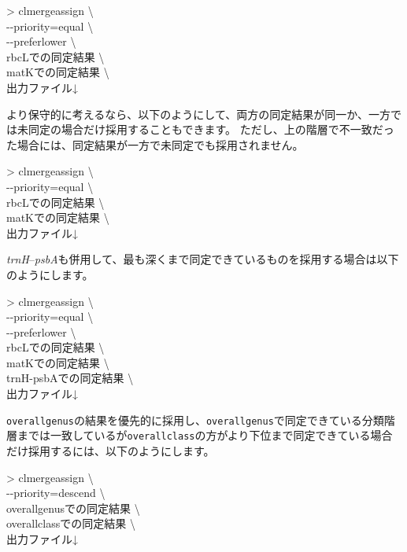 \documentclass[titlepage,10pt,a4paper]{jsbook}
\newenvironment{cmd}{\begin{oframed}\raggedright\ttfamily\footnotesize\setlength{\baselineskip}{1.4em}}{\end{oframed}\vspace{-1em}}
\begin{document}
\begin{cmd}
{\textgreater} clmergeassign {\textbackslash}\\
{-}{-}priority=equal {\textbackslash}\\
{-}{-}preferlower {\textbackslash}\\
rbcLでの同定結果 {\textbackslash}\\
matKでの同定結果 {\textbackslash}\\
出力ファイル↓
\end{cmd}

より保守的に考えるなら、以下のようにして、両方の同定結果が同一か、一方では未同定の場合だけ採用することもできます。
ただし、上の階層で不一致だった場合には、同定結果が一方で未同定でも採用されません。

\begin{cmd}
{\textgreater} clmergeassign {\textbackslash}\\
{-}{-}priority=equal {\textbackslash}\\
rbcLでの同定結果 {\textbackslash}\\
matKでの同定結果 {\textbackslash}\\
出力ファイル↓
\end{cmd}

\textit{trnH}--\textit{psbA}も併用して、最も深くまで同定できているものを採用する場合は以下のようにします。

\begin{cmd}
{\textgreater} clmergeassign {\textbackslash}\\
{-}{-}priority=equal {\textbackslash}\\
{-}{-}preferlower {\textbackslash}\\
rbcLでの同定結果 {\textbackslash}\\
matKでの同定結果 {\textbackslash}\\
trnH-psbAでの同定結果 {\textbackslash}\\
出力ファイル↓
\end{cmd}

\texttt{overall{\textunderscore}genus}の結果を優先的に採用し、\texttt{overall{\textunderscore}genus}で同定できている分類階層までは一致しているが\texttt{overall{\textunderscore}class}の方がより下位まで同定できている場合だけ採用するには、以下のようにします。

\begin{cmd}
{\textgreater} clmergeassign {\textbackslash}\\
{-}{-}priority=descend {\textbackslash}\\
overall{\textunderscore}genusでの同定結果 {\textbackslash}\\
overall{\textunderscore}classでの同定結果 {\textbackslash}\\
出力ファイル↓
\end{cmd}
\end{document}
